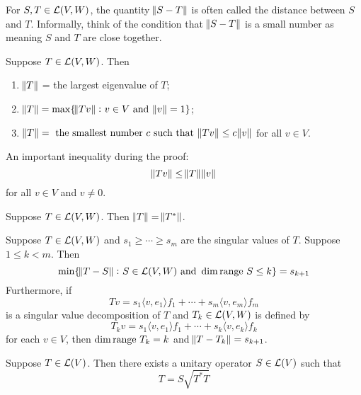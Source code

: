 \documentclass{extarticle}
\begin{document}
\begin{remark}
    For \(S, T \in \mathcal{L}(V, W)\), the quantity \(\norm{S - T}\) is often called the distance between 
    \(S\) and \(T\). Informally, think of the condition that \(\norm{S - T}\) is a small number 
    as meaning \(S\) and \(T\) are close together. 
\end{remark}

\begin{thm}
    Suppose \(T \in \mathcal{L}(V, W)\). Then 
    \begin{enumerate}[label=(\alph*)]
        \item \(\norm{T}\) = the largest eigenvalue of \(T\); 
        \item \(\norm{T} = \max \{\norm{Tv} \colon v \in V \text{ and } \norm{v} = 1\} \); 
        \item \(\norm{T} = \text{ the smallest number } c \text{ such that } \norm{Tv} \leq c \norm{v}\) 
        for all \(v \in V\).
    \end{enumerate}
\end{thm}

\begin{remark}
    An important inequality during the proof:
    \[\norm{Tv} \leq \norm{T} \norm{v}\]
    for all \(v \in V\) and \(v \neq 0\). 
\end{remark}

\begin{corollary}
    Suppose \(T \in \mathcal{L}(V, W)\). Then \(\norm{T} = \norm{T^*}\).
\end{corollary}

\begin{thm}
Suppose \(T \in \mathcal{L}(V, W)\) and \(s_1 \geq \cdots \geq s_m\) are the singular 
values of \(T\). Suppose \(1 \leq k < m\). Then 
\[\min \{\norm{T - S} \colon S \in \mathcal{L}(V, W) \text{ and } 
\dim \text{range } S \leq k\} = s_{k+1}\]
Furthermore, if 
\[Tv = s_1 \langle v,e_1 \rangle f_1 + \cdots + s_m \langle v,e_m \rangle f_m\]
is a singular value decomposition of \(T\) and \(T_k \in \mathcal{L}(V, W)\) is 
defined by 
\[T_k v = s_1 \langle v,e_1 \rangle f_1 + \cdots + s_k \langle v,e_k \rangle f_k\]
for each \(v \in V\), then \(\dim \text{range } T_k = k\) and \(\norm{T - T_k} = s_{k+1}\).
\end{thm}

\begin{thm}
    Suppose \(T \in \mathcal{L}(V)\). Then there exists a unitary operator 
    \(S \in \mathcal{L}(V)\) such that 
    \[T = S \sqrt{T^* T}\]
\end{thm}
\end{document}
